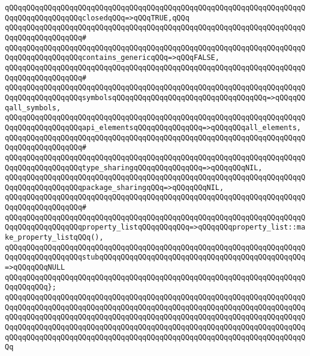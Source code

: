 \verb|qQQqqQQqqQQqqQQqqQQqqQQqqQQqqQQqqQQqqQQqqQQqqQQqqQQqqQQqqQQqqQQqqQQqqQQqqQQqqQQqqQQqqQQqclosedqQQq=>qQQqTRUE,qQQq|\newline
\verb|qQQqqQQqqQQqqQQqqQQqqQQqqQQqqQQqqQQqqQQqqQQqqQQqqQQqqQQqqQQqqQQqqQQqqQQqqQQqqQQqqQQqqQQq#|\newline
\verb|qQQqqQQqqQQqqQQqqQQqqQQqqQQqqQQqqQQqqQQqqQQqqQQqqQQqqQQqqQQqqQQqqQQqqQQqqQQqqQQqqQQqqQQqcontains_genericqQQq=>qQQqFALSE,|\newline
\verb|qQQqqQQqqQQqqQQqqQQqqQQqqQQqqQQqqQQqqQQqqQQqqQQqqQQqqQQqqQQqqQQqqQQqqQQqqQQqqQQqqQQqqQQq#|\newline
\verb|qQQqqQQqqQQqqQQqqQQqqQQqqQQqqQQqqQQqqQQqqQQqqQQqqQQqqQQqqQQqqQQqqQQqqQQqqQQqqQQqqQQqqQQqsymbolsqQQqqQQqqQQqqQQqqQQqqQQqqQQqqQQqqQQq=>qQQqqQQqall_symbols,|\newline
\verb|qQQqqQQqqQQqqQQqqQQqqQQqqQQqqQQqqQQqqQQqqQQqqQQqqQQqqQQqqQQqqQQqqQQqqQQqqQQqqQQqqQQqqQQqapi_elementsqQQqqQQqqQQqqQQq=>qQQqqQQqall_elements,|\newline
\verb|qQQqqQQqqQQqqQQqqQQqqQQqqQQqqQQqqQQqqQQqqQQqqQQqqQQqqQQqqQQqqQQqqQQqqQQqqQQqqQQqqQQqqQQq#|\newline
\verb|qQQqqQQqqQQqqQQqqQQqqQQqqQQqqQQqqQQqqQQqqQQqqQQqqQQqqQQqqQQqqQQqqQQqqQQqqQQqqQQqqQQqqQQqtype_sharingqQQqqQQqqQQqqQQq=>qQQqqQQqNIL,|\newline
\verb|qQQqqQQqqQQqqQQqqQQqqQQqqQQqqQQqqQQqqQQqqQQqqQQqqQQqqQQqqQQqqQQqqQQqqQQqqQQqqQQqqQQqqQQqpackage_sharingqQQq=>qQQqqQQqNIL,|\newline
\verb|qQQqqQQqqQQqqQQqqQQqqQQqqQQqqQQqqQQqqQQqqQQqqQQqqQQqqQQqqQQqqQQqqQQqqQQqqQQqqQQqqQQqqQQq#|\newline
\verb|qQQqqQQqqQQqqQQqqQQqqQQqqQQqqQQqqQQqqQQqqQQqqQQqqQQqqQQqqQQqqQQqqQQqqQQqqQQqqQQqqQQqqQQqproperty_listqQQqqQQqqQQq=>qQQqqQQqproperty_list::make_property_listqQQq(),|\newline
\verb|qQQqqQQqqQQqqQQqqQQqqQQqqQQqqQQqqQQqqQQqqQQqqQQqqQQqqQQqqQQqqQQqqQQqqQQqqQQqqQQqqQQqqQQqstubqQQqqQQqqQQqqQQqqQQqqQQqqQQqqQQqqQQqqQQqqQQqqQQq=>qQQqqQQqNULL|\newline
\verb|qQQqqQQqqQQqqQQqqQQqqQQqqQQqqQQqqQQqqQQqqQQqqQQqqQQqqQQqqQQqqQQqqQQqqQQqqQQqqQQq};|\newline
\newline
\verb|qQQqqQQqqQQqqQQqqQQqqQQqqQQqqQQqqQQqqQQqqQQqqQQqqQQqqQQqqQQqqQQqqQQqqQQqqQQqqQQqqQQqqQQqqQQqqQQqqQQqqQQqqQQqqQQqqQQqqQQqqQQqqQQqqQQqqQQqqQQqqQQqqQQqqQQqqQQqqQQqqQQqqQQqqQQqqQQqqQQqqQQqqQQqqQQqqQQqqQQqqQQqqQQqqQQqqQQqqQQqqQQqqQQqqQQqqQQqqQQqqQQqqQQqqQQqqQQqqQQqqQQqqQQqqQQqqQQqqQQqqQQqqQQqqQQqqQQqqQQqqQQqqQQqqQQqqQQqqQQqqQQqqQQqqQQqqQQqqQQqqQQqqQQqqQQq|\newline
